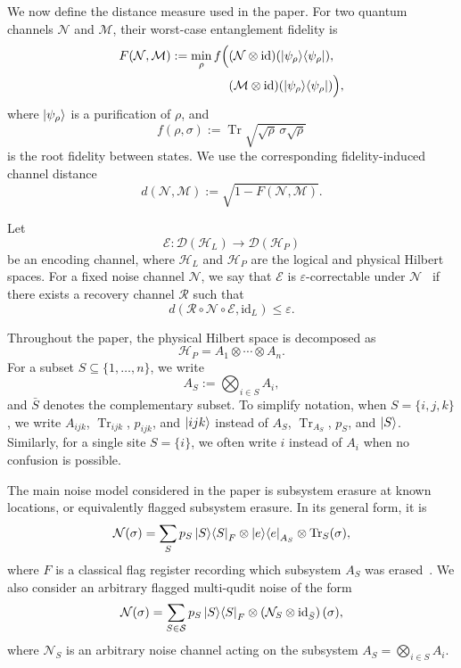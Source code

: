 \documentclass[10pt,twocolumn,superscriptaddress,aps,amsmath,amssymb,citeautoscript,floatfix,prx,longbibliography]{revtex4-2}
\theoremstyle{plain}
\theoremstyle{plain}
\theoremstyle{plain}
\theoremstyle{plain}
\theoremstyle{plain}
\theoremstyle{plain}
\begin{document}
We now define the distance measure used in the paper. For two quantum channels $\mathcal N$ and $\mathcal M$, their worst-case entanglement fidelity is
$$
\begin{aligned}
    F(\mathcal N,\mathcal M)
    :=
    \min_\rho
    f\Big(
        &(\mathcal N\otimes\mathrm{id})
        (\ket{\psi_\rho}\!\bra{\psi_\rho}),
        \\
        &(\mathcal M\otimes\mathrm{id})
        (\ket{\psi_\rho}\!\bra{\psi_\rho})
    \Big),
\end{aligned}
$$
where $\ket{\psi_\rho}$ is a purification of $\rho$, and
$$
    f(\rho,\sigma)
    :=
    \operatorname{Tr}
    \sqrt{\sqrt\rho\,\sigma\sqrt\rho}
$$
is the root fidelity between states. We use the corresponding fidelity-induced channel distance
\begin{equation}\label{eq:distance_def}
    d(\mathcal N,\mathcal M)
    :=
    \sqrt{1-F(\mathcal N,\mathcal M)} .
\end{equation}

Let
$$
    \mathcal E:
    \mathcal D(\mathcal H_L)
    \to
    \mathcal D(\mathcal H_P)
$$
be an encoding channel, where $\mathcal H_L$ and $\mathcal H_P$ are the logical and physical Hilbert spaces. For a fixed noise channel $\mathcal N$, we say that $\mathcal E$ is $\varepsilon$-correctable under $\mathcal N$~\cite{Beny2010} if there exists a recovery channel $\mathcal R$ such that
$$
    d(\mathcal R\circ\mathcal N\circ\mathcal E,\mathrm{id}_L)
    \le
    \varepsilon .
$$

Throughout the paper, the physical Hilbert space is decomposed as
$$
    \mathcal H_P
    =
    A_1\otimes\cdots\otimes A_n .
$$
For a subset $S\subseteq\{1,\ldots,n\}$, we write
$$
    A_S
    :=
    \bigotimes_{i\in S}A_i,
$$
and $\bar S$ denotes the complementary subset. To simplify notation, when $S=\{i,j,k\}$, we write $A_{ijk}$, $\operatorname{Tr}_{ijk}$, $p_{ijk}$, and $\ket{ijk}$ instead of $A_S$, $\operatorname{Tr}_{A_S}$, $p_S$, and $\ket S$. Similarly, for a single site $S=\{i\}$, we often write $i$ instead of $A_i$ when no confusion is possible.

The main noise model considered in the paper is subsystem erasure at known locations, or equivalently flagged subsystem erasure. In its general form, it is
\begin{equation}\label{eq:erasure_noise}
    \mathcal N(\sigma)
    =
    \sum_S
    p_S
    \ket S\!\bra S_F
    \otimes
    \ket e\!\bra e_{A_S}
    \otimes
    \operatorname{Tr}_S(\sigma),
\end{equation}
where $F$ is a classical flag register recording which subsystem $A_S$ was erased~\cite{Faist2020}. We also consider an arbitrary flagged multi-qudit noise of the form
\begin{equation}\label{eq:arbitrary_multiqudit_noise}
    \mathcal N(\sigma)
    =
    \sum_{S\in\mathcal S}
    p_S
    \ket S\!\bra S_F
    \otimes
    \left(
        \mathcal N_S
        \otimes
        \mathrm{id}_{\bar S}
    \right)(\sigma),
\end{equation}
where $\mathcal N_S$ is an arbitrary noise channel acting on the subsystem $A_S=\bigotimes_{i\in S}A_i$.
\end{document}
